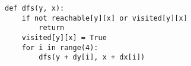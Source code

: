 \documentclass[preview]{standalone}
\begin{document}
\centering \begin{verbatim}
def dfs(y, x):
    if not reachable[y][x] or visited[y][x] 
        return
    visited[y][x] = True
    for i in range(4):
        dfs(y + dy[i], x + dx[i])
\end{verbatim}
\end{document}
